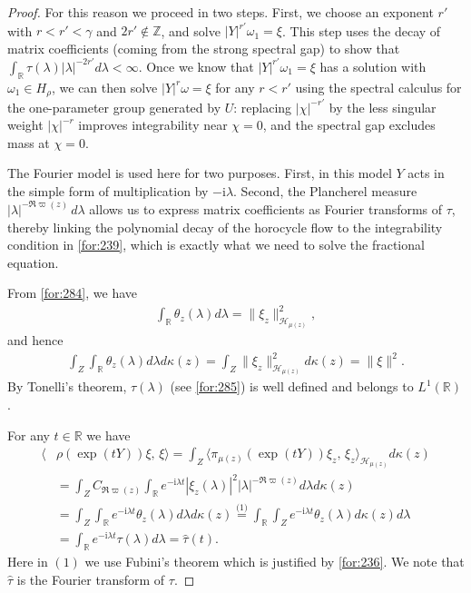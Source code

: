 \documentclass[11 pt]{amsart}
\newcommand{\RR}{\mathbb{R}}
\newcommand{\R}{\mathbb{R}}
\newcommand{\norm}[1]{\lVert#1\rVert}
\theoremstyle{definition}
\numberwithin{equation}{section}
\begin{document}
\begin{proof}
For this reason we proceed in two steps. First, we choose an exponent
$r'$ with $r<r'<\gamma$ and $2r'\notin\mathbb Z$, and solve
\(|Y|^{r'}\omega_1=\xi\). This step uses the decay of matrix coefficients
(coming from the strong spectral gap) to show that
\(\int_{\mathbb R}\tau(\lambda)|\lambda|^{-2r'}d\lambda<\infty\).
Once we know that \(|Y|^{r'}\omega_1=\xi\) has a solution with
$\omega_1\in H_\rho$, we can then solve \(|Y|^r\omega=\xi\) for any
$r<r'$ using the spectral calculus for the one-parameter group generated
by $U$: replacing \(|\chi|^{-r'}\) by the less singular weight
\(|\chi|^{-r}\) improves integrability near $\chi=0$, and the spectral
gap excludes mass at $\chi=0$.

The Fourier model is used here for two purposes. First, in this model $Y$ acts in the simple form of multiplication by $-\mathrm{i}\lambda$.
Second, the Plancherel measure $|\lambda|^{-\Re\varpi(z)}\,d\lambda$ allows us
to express matrix coefficients as Fourier transforms of $\tau$, thereby
linking the polynomial decay of the horocycle flow to the integrability
condition in \eqref{for:239}, which is exactly what we need to solve
the fractional equation.

\smallskip


From \eqref{for:284}, we have
\begin{align*}
 \int_{\R} \theta_z(\lambda)d\lambda=\norm{\xi_z}_{\mathcal{H}_{\mu(z)}}^2,
\end{align*}
and hence
\begin{align}\label{for:236}
 \int_Z\int_{\R} \theta_z(\lambda)d\lambda d\kappa(z)=\int_Z\norm{\xi_z}_{\mathcal{H}_{\mu(z)}}^2d\kappa(z)=\norm{\xi}^2.
\end{align}
By Tonelli's theorem, $\tau(\lambda)$ (see \eqref{for:285}) is well defined and belongs to $L^1(\R)$.

For any $t\in\RR$ we have
\begin{align*}
 \big\langle &\rho(\exp(tY))\xi,\,\xi\big\rangle=\int_Z\big\langle \pi_{\mu(z)}(\exp(tY))\xi_z,\,\xi_z\big\rangle_{\mathcal{H}_{\mu(z)}} d\kappa(z)\\
 &=\int_ZC_{\Re\varpi(z)} \int_{\R} e^{-\textrm{i}\lambda t}|\xi_z(\lambda)|^2 \vert \lambda\vert^{-\Re\varpi(z)} d\lambda d\kappa(z)\\
 &=\int_Z \int_{\R} e^{-\textrm{i}\lambda t} \theta_z(\lambda) d\lambda d\kappa(z)\overset{\text{(1)}}{=}  \int_{\R} \int_Ze^{-\textrm{i}\lambda t} \theta_z(\lambda)  d\kappa(z)d\lambda\\
&= \int_{\R} e^{-\textrm{i}\lambda t} \tau(\lambda) d\lambda=\hat{\tau}(t).
\end{align*}
Here in $(1)$ we use Fubini's theorem which is justified by \eqref{for:236}. We note that  $\widehat{\tau}$ is the Fourier transform of $\tau$.






\end{proof}
\end{document}

